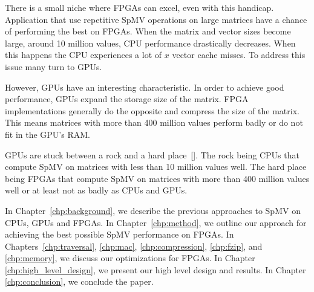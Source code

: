 \par There is a small niche where FPGAs can excel, even with this handicap. Application that use repetitive SpMV operations on large matrices have a chance of performing the best on FPGAs. When the matrix and vector sizes  become large, around 10 million values, CPU performance drastically decreases. When this happens the CPU experiences a lot of $x$ vector cache misses. To address this issue many turn to GPUs.
\par However, GPUs have an interesting characteristic. In order to achieve good performance, GPUs expand the storage size of the matrix. FPGA implementations generally do the opposite and compress the size of the matrix. This means matrices with more than 400 million values perform badly or do not fit in the GPU's RAM.
\par GPUs are stuck between a rock and a hard place~[\cite{prelim:davis0}]. The rock being CPUs that compute SpMV on matrices with less than 10 million values well. The hard place being FPGAs that compute SpMV on matrices with more than 400 million values well or at least not as badly as CPUs and GPUs.
\par In Chapter~\ref{chp:background}, we describe the previous approaches to SpMV on CPUs, GPUs and FPGAs. In Chapter~\ref{chp:method}, we outline our approach for achieving the best possible SpMV performance on FPGAs. In Chapters~\ref{chp:traversal}, \ref{chp:mac}, \ref{chp:compression}, \ref{chp:fzip}, and \ref{chp:memory}, we discuss our optimizations for FPGAs. In Chapter \ref{chp:high_level_design}, we present our high level design and results. In Chapter \ref{chp:conclusion}, we conclude the paper.
